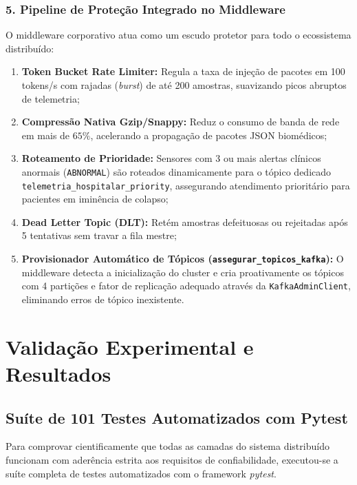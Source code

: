 \documentclass[12pt,a4paper]{article}
\begin{document}
\subsubsection{5. Pipeline de Proteção Integrado no Middleware}
O middleware corporativo atua como um escudo protetor para todo o ecossistema distribuído:
\begin{enumerate}
	\item \textbf{Token Bucket Rate Limiter:} Regula a taxa de injeção de pacotes em 100 tokens/s com rajadas (\textit{burst}) de até 200 amostras, suavizando picos abruptos de telemetria;
	\item \textbf{Compressão Nativa Gzip/Snappy:} Reduz o consumo de banda de rede em mais de $65\%$, acelerando a propagação de pacotes JSON biomédicos;
	\item \textbf{Roteamento de Prioridade:} Sensores com 3 ou mais alertas clínicos anormais (\texttt{ABNORMAL}) são roteados dinamicamente para o tópico dedicado \texttt{telemetria\_hospitalar\_priority}, assegurando atendimento prioritário para pacientes em iminência de colapso;
	\item \textbf{Dead Letter Topic (DLT):} Retém amostras defeituosas ou rejeitadas após 5 tentativas sem travar a fila mestre;
	\item \textbf{Provisionador Automático de Tópicos (\texttt{assegurar\_topicos\_kafka}):} O middleware detecta a inicialização do cluster e cria proativamente os tópicos com 4 partições e fator de replicação adequado através da \texttt{KafkaAdminClient}, eliminando erros de tópico inexistente.
\end{enumerate}

\newpage

\section{Validação Experimental e Resultados}
\label{sec:validacao}

\subsection{Suíte de 101 Testes Automatizados com Pytest}
Para comprovar cientificamente que todas as camadas do sistema distribuído funcionam com aderência estrita aos requisitos de confiabilidade, executou-se a suíte completa de testes automatizados com o framework \textit{pytest}.
\end{document}
